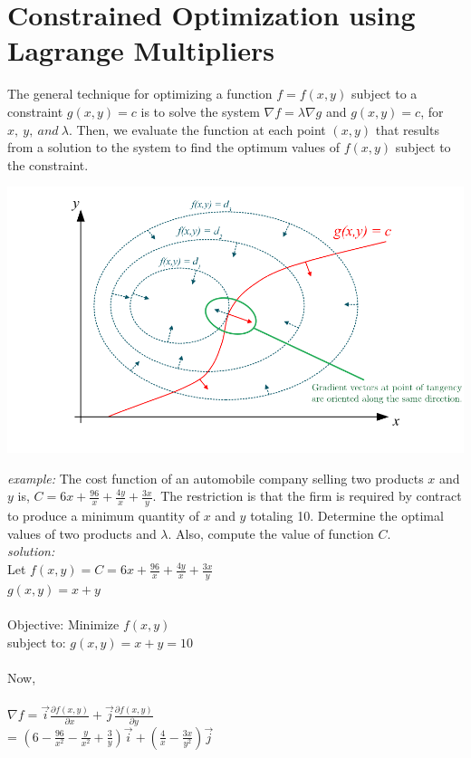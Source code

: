 \section{Constrained Optimization using Lagrange Multipliers}
The general technique for optimizing a function $f = f(x,y) $ subject to a constraint $ g(x,y) = c $ is to solve the system $ \nabla f = \lambda \nabla g $ and $g(x,y) = c$, for $x,\: y,\: and \:\lambda$. Then, we evaluate the function at each point $(x,y)$ that results from a solution to the system to find the optimum values of $f(x,y)$ subject to the constraint.
\begin{center}
	\includegraphics[scale=0.3]{gfx/lg.png}
\end{center}
\emph{example:} The cost function of an automobile company selling two products $x$ and $y$ is, $C = 6x + \frac{96}{x} + \frac{4y}{x}+ \frac{3x}{y}$. The restriction is that the firm is required by contract to produce a minimum quantity of $x$ and $y$ totaling 10. Determine the optimal values of two products and $\lambda$. Also, compute the value of function $C$.\\
\emph{solution:}\\
Let $f(x,y) = C = 6x + \frac{96}{x} + \frac{4y}{x}+ \frac{3x}{y}$\\
$g(x,y) = x + y$\\\\
Objective: Minimize $f(x,y)$\\
subject to: $g(x,y) = x + y = 10$\\\\
Now,\\\\
$\nabla f = \Vec{i}\frac{\partial{f(x,y)}}{\partial {x}} + \Vec{j}\frac{\partial{f(x,y)}}{\partial {y}}$\\
\hspace*{5 mm} = $\left( 6 - \frac{96}{x^2} - \frac{y}{x^2} + \frac{3}{y} \right) \Vec{i} + \left( \frac{4}{x} - \frac{3x}{y^2} \right) \Vec{j}$ \\\\
